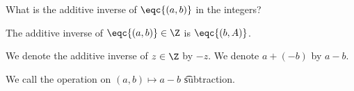 

What is the additive inverse of $\eqc{(a, b)}$ in the integers?


\begin{proposition}
  The additive inverse of $\eqc{(a, b)} \in \Z$ is $\eqc{(b, A)}$.
\end{proposition}




We denote the additive inverse of $z \in \Z$ by $-z$.
We denote $a + (- b)$ by $a - b$.


We call the operation on $(a, b) \mapsto a - b$ \t{subtraction}.
